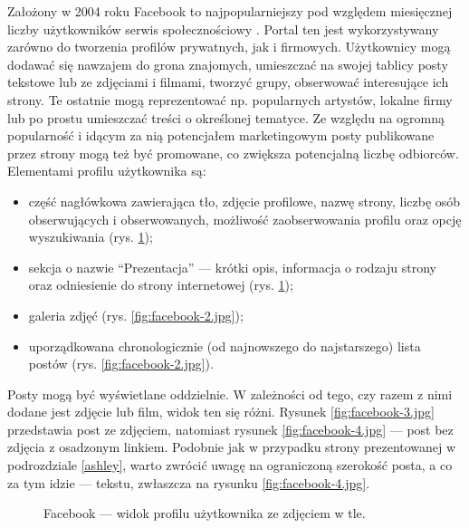 \documentclass[12pt]{article}
\numberwithin{figure}{section}
\begin{document}
\begin{sloppypar}
Założony w 2004 roku \cite{historiafacebooka} Facebook to najpopularniejszy pod względem miesięcznej liczby użytkowników serwis społecznościowy \cite{socialmediastats}. Portal ten jest wykorzystywany zarówno do tworzenia profilów prywatnych, jak i firmowych. Użytkownicy mogą dodawać się nawzajem do grona znajomych, umieszczać na swojej tablicy posty tekstowe lub ze zdjęciami i filmami, tworzyć grupy, obserwować interesujące ich strony. Te ostatnie mogą reprezentować np. popularnych artystów, lokalne firmy lub po prostu umieszczać treści o określonej tematyce. Ze względu na ogromną popularność i idącym za nią potencjałem marketingowym posty publikowane przez strony mogą też być promowane, co zwiększa potencjalną liczbę odbiorców. Elementami profilu użytkownika są: 
\begin{itemize}
    \item część nagłówkowa zawierająca tło, zdjęcie profilowe, nazwę strony, liczbę osób obserwujących i obserwowanych, możliwość zaobserwowania profilu oraz opcję wyszukiwania (rys. \ref{fig:facebook-1.jpg});
    \item sekcja o nazwie ``Prezentacja'' --- krótki opis, informacja o rodzaju strony oraz odniesienie do strony internetowej (rys. \ref{fig:facebook-1.jpg});
    \item galeria zdjęć (rys. \ref{fig:facebook-2.jpg});
    \item uporządkowana chronologicznie (od najnowszego do najstarszego) lista postów (rys. \ref{fig:facebook-2.jpg}).
\end{itemize}
Posty mogą być wyświetlane oddzielnie. W zależności od tego, czy razem z nimi dodane jest zdjęcie lub film, widok ten się różni. Rysunek \ref{fig:facebook-3.jpg} przedstawia post ze zdjęciem, natomiast rysunek \ref{fig:facebook-4.jpg} --- post bez zdjęcia z osadzonym linkiem. Podobnie jak w przypadku strony prezentowanej \linebreak w podrozdziale \ref{ashley}, warto zwrócić uwagę na ograniczoną szerokość posta, a co za tym idzie --- tekstu, zwłaszcza na rysunku \ref{fig:facebook-4.jpg}. 

\begin{figure}[H] 
    \centering
   \caption{Facebook --- widok profilu użytkownika ze zdjęciem w tle.}
   \label{fig:facebook-1.jpg}
\end{figure}


\end{sloppypar}
\end{document}
